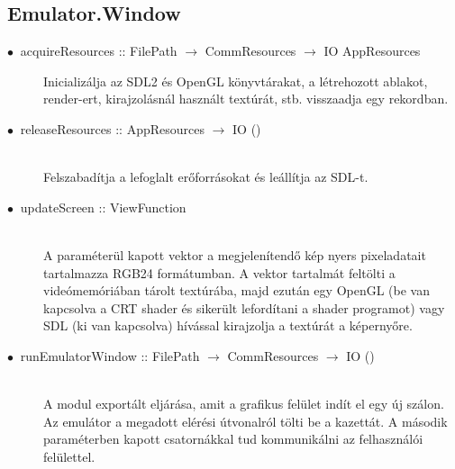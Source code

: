 \subsection{Emulator.Window}

\begin{description}
	\item[$\bullet\:$ acquireResources :: FilePath $\rightarrow$ CommResources $\rightarrow$ IO AppResources] \hfill Inicializálja az SDL2 és OpenGL könyvtárakat, a létrehozott ablakot, render-ert, kirajzolásnál használt textúrát, stb. visszaadja egy rekordban.
	\item[$\bullet\:$ releaseResources :: AppResources $\rightarrow$ IO ()] \hfill \\
	Felszabadítja a lefoglalt erőforrásokat és leállítja az SDL-t.
	\item[$\bullet\:$ updateScreen :: ViewFunction] \hfill \\
	A paraméterül kapott vektor a megjelenítendő kép nyers pixeladatait tartalmazza RGB24 formátumban. A vektor tartalmát feltölti a videómemóriában tárolt textúrába, majd ezután egy OpenGL (be van kapcsolva a CRT shader és sikerült lefordítani a shader programot) vagy SDL (ki van kapcsolva) hívással kirajzolja a textúrát a képernyőre.
	\item[$\bullet\:$ runEmulatorWindow :: FilePath $\rightarrow$ CommResources $\rightarrow$ IO ()] \hfill \\
	A modul exportált eljárása, amit a grafikus felület indít el egy új szálon. Az emulátor a megadott elérési útvonalról tölti be a kazettát. A második paraméterben kapott csatornákkal tud kommunikálni az felhasználói felülettel.
\end{description}

